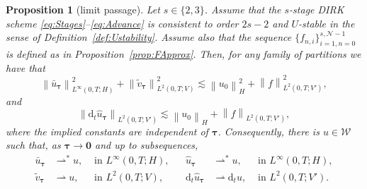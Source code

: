 \documentclass{amsart}
\newcommand{\nrm}[1]{\left\| #1 \right\|}
\newcommand{\bftau}{{\boldsymbol{\tau}}}
\newcommand{\mclW}{\mathcal{W}}
\newcommand{\mclN}{\mathcal{N}}
\newcommand{\bfzero}{\mathbf{0}}
\newtheorem{proposition}{Proposition}[section]
\theoremstyle{definition}
\newcommand{\diff}{\mathrm{d}}
\begin{document}
\begin{proposition}[limit passage]
\label{prop:Limit}
  Let $s \in \{2,3\}$. Assume that the $s$-stage DIRK scheme \eqref{eq:Stages}--\eqref{eq:Advance} is consistent to order $2s-2$ and $U$-stable in the sense of Definition~\ref{def:Ustability}. Assume also that the sequence $\{f_{n,i}\}_{i=1,n=0}^{s,\mclN-1}$ is defined as in Proposition~\ref{prop:FApprox}. Then, for any family of partitions we have that
  \begin{equation}
  \label{eq:EnergyApriori}
    \nrm{\bar{u}_\bftau}_{L^\infty(0,T;H)}^2 + \nrm{\tilde{v}_\bftau}_{L^2(0,T;V)}^2 \lesssim \nrm{u_0}_H^2 + \nrm{ f }_{L^2(0,T;V')}^2,
  \end{equation}
  and
  \begin{equation}
  \label{eq:DerivApriori}
    \nrm{\diff_t \hat{u}_\bftau }_{L^2(0,T;V')} \lesssim \nrm{u_0}_H + \nrm{ f }_{L^2(0,T;V')},
  \end{equation}
  where the implied constants are independent of $\bftau$. Consequently, there is $u \in \mclW$ such that, as $\bftau \to \bfzero$ and up to subsequences,
  \begin{equation}
  \label{eq:limits}
    \begin{aligned}
      \bar{u}_\bftau &\rightharpoonup^* u, & \text{ in } L^\infty(0,T;H), &&
      \hat{u}_\bftau &\rightharpoonup^* u, & \text{ in } L^\infty(0,T;H), \\
      \tilde{v}_\bftau &\rightharpoonup u, & \text{ in } L^2(0,T;V), &&
      \diff_t\hat{u}_\bftau &\rightharpoonup \diff_t u, & \text{ in } L^2(0,T;V').
    \end{aligned}
  \end{equation}
\end{proposition}
\end{document}
